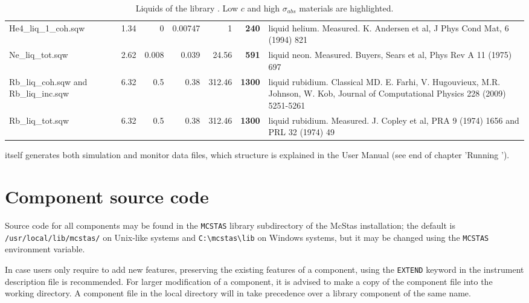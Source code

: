 \begin{table}
\begin{center}
{\begin{small}
\begin{tabular}{|l|rrr|rr|p{}|}
He4\_liq\_1\_coh.sqw                  & 1.34      & 0        &0.00747   &1         &\textbf{240}   & liquid helium. Measured. K. Andersen et al, J Phys Cond Mat, 6 (1994) 821\\
Ne\_liq\_tot.sqw                      & 2.62      & 0.008    &0.039     &24.56     &\textbf{591}   & liquid neon. Measured. Buyers, Sears et al, Phys Rev A 11 (1975) 697\\
Rb\_liq\_coh.sqw and Rb\_liq\_inc.sqw & 6.32      & 0.5      &0.38      &312.46    &\textbf{1300}  & liquid rubidium. Classical MD. E. Farhi, V. Hugouvieux, M.R. Johnson, W. Kob, Journal of Computational Physics 228 (2009) 5251-5261 \\
Rb\_liq\_tot.sqw                      & 6.32      & 0.5      &0.38      &312.46    &\textbf{1300}  & liquid rubidium. Measured. J. Copley et al, PRA 9 (1974) 1656 and PRL 32 (1974) 49 \\
      \hline
    \end{tabular}\end{small}
    \caption{Liquids of the \MCS library \cite{icsd_ill,ILLblue}. Low $c$ and high $\sigma_{abs}$ materials are highlighted.}
    \label{t:liquids-data}
    }
  \end{center}
\end{table}

\MCS itself generates both simulation and monitor data files, which structure is explained in the User Manual (see end of chapter 'Running \MCS ').

\section{Component source code}
Source code for all components may be found in the \verb+MCSTAS+ library
subdirectory of the McStas installation;
the default is \verb+/usr/local/lib/mcstas/+
on Unix-like systems and \verb+C:\mcstas\lib+ on Windows systems, but it may be
changed using the \verb+MCSTAS+ environment variable.

In case users only require to add new features, preserving the existing features of a component,
using the \verb+EXTEND+ keyword in the instrument description file is recommended. For larger modification of a component, it is advised to make a copy
of the component file into the working directory.
A component file in the local directory will in \MCS take precedence over
a library component of the same name.

